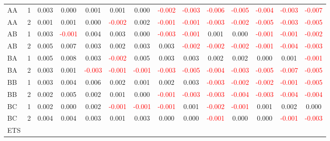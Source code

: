 \begin{table}[H]
{\begin{tabular}{llcccccccccccc}
AA & 1 & 0.003 & 0.000 & 0.001 & 0.001 & 0.000 & \textcolor{red}{-0.002} & \textcolor{red}{-0.003} & \textcolor{red}{-0.006} & \textcolor{red}{-0.005} & \textcolor{red}{-0.004} & \textcolor{red}{-0.003} & \textcolor{red}{-0.007}\\
AA & 2 & 0.001 & 0.001 & 0.000 & \textcolor{red}{-0.002} & 0.002 & \textcolor{red}{-0.001} & \textcolor{red}{-0.001} & \textcolor{red}{-0.003} & \textcolor{red}{-0.002} & \textcolor{red}{-0.005} & \textcolor{red}{-0.003} & \textcolor{red}{-0.005}\\
AB & 1 & 0.003 & \textcolor{red}{-0.001} & 0.004 & 0.003 & 0.000 & \textcolor{red}{-0.003} & \textcolor{red}{-0.001} & 0.001 & 0.000 & \textcolor{red}{-0.001} & \textcolor{red}{-0.001} & \textcolor{red}{-0.002}\\
AB & 2 & 0.005 & 0.007 & 0.003 & 0.002 & 0.003 & 0.003 & \textcolor{red}{-0.002} & \textcolor{red}{-0.002} & \textcolor{red}{-0.002} & \textcolor{red}{-0.001} & \textcolor{red}{-0.004} & \textcolor{red}{-0.003}\\
BA & 1 & 0.005 & 0.008 & 0.003 & \textcolor{red}{-0.002} & 0.005 & 0.003 & 0.003 & 0.002 & 0.002 & 0.000 & 0.001 & \textcolor{red}{-0.001}\\
BA & 2 & 0.003 & 0.001 & \textcolor{red}{-0.003} & \textcolor{red}{-0.001} & \textcolor{red}{-0.001} & \textcolor{red}{-0.003} & \textcolor{red}{-0.005} & \textcolor{red}{-0.004} & \textcolor{red}{-0.003} & \textcolor{red}{-0.005} & \textcolor{red}{-0.007} & \textcolor{red}{-0.005}\\
BB & 1 & 0.003 & 0.004 & 0.006 & 0.002 & 0.001 & 0.002 & 0.003 & \textcolor{red}{-0.003} & \textcolor{red}{-0.002} & \textcolor{red}{-0.002} & \textcolor{red}{-0.001} & \textcolor{red}{-0.005}\\
BB & 2 & 0.002 & 0.005 & 0.002 & 0.001 & 0.000 & \textcolor{red}{-0.001} & \textcolor{red}{-0.003} & \textcolor{red}{-0.003} & \textcolor{red}{-0.004} & \textcolor{red}{-0.003} & \textcolor{red}{-0.004} & \textcolor{red}{-0.004}\\
BC & 1 & 0.002 & 0.000 & 0.002 & \textcolor{red}{-0.001} & \textcolor{red}{-0.001} & \textcolor{red}{-0.001} & 0.001 & \textcolor{red}{-0.002} & \textcolor{red}{-0.001} & 0.001 & 0.002 & 0.000\\
BC & 2 & 0.004 & 0.004 & 0.003 & 0.001 & 0.003 & 0.000 & 0.000 & \textcolor{red}{-0.001} & 0.000 & 0.000 & \textcolor{red}{-0.001} & \textcolor{red}{-0.003}\\
\hline
ETS &  &  &  &  &  &  &  &  &  &  &  &  & \\

\end{tabular}}
\end{table}
